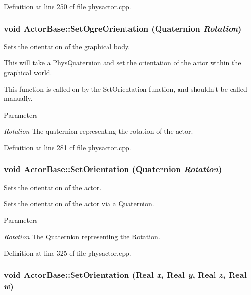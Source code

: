 Definition at line 250 of file physactor.cpp.

\hypertarget{classActorBase_ad13a4ba6d349dfab4965e58b8335d519}{
\subsubsection[{SetOgreOrientation}]{\setlength{\rightskip}{0pt plus 5cm}void ActorBase::SetOgreOrientation ({\bf Quaternion} {\em Rotation})}}
\label{dd/d7b/classActorBase_ad13a4ba6d349dfab4965e58b8335d519}


Sets the orientation of the graphical body. 

This will take a PhysQuaternion and set the orientation of the actor within the graphical world. \par
 This function is called on by the SetOrientation function, and shouldn't be called manually. 
\begin{DoxyParams}{Parameters}
\item[{\em Rotation}]The quaternion representing the rotation of the actor. \end{DoxyParams}


Definition at line 281 of file physactor.cpp.

\hypertarget{classActorBase_a66429021cfc19b32cd0f645955e20584}{
\subsubsection[{SetOrientation}]{\setlength{\rightskip}{0pt plus 5cm}void ActorBase::SetOrientation ({\bf Quaternion} {\em Rotation})}}
\label{dd/d7b/classActorBase_a66429021cfc19b32cd0f645955e20584}


Sets the orientation of the actor. 

Sets the orientation of the actor via a Quaternion. 
\begin{DoxyParams}{Parameters}
\item[{\em Rotation}]The Quaternion representing the Rotation. \end{DoxyParams}


Definition at line 325 of file physactor.cpp.

\hypertarget{classActorBase_a676bcd5370c2e4a4e81d8bde7ed3970f}{
\subsubsection[{SetOrientation}]{\setlength{\rightskip}{0pt plus 5cm}void ActorBase::SetOrientation (Real {\em x}, \/  Real {\em y}, \/  Real {\em z}, \/  Real {\em w})}}
\label{dd/d7b/classActorBase_a676bcd5370c2e4a4e81d8bde7ed3970f}


